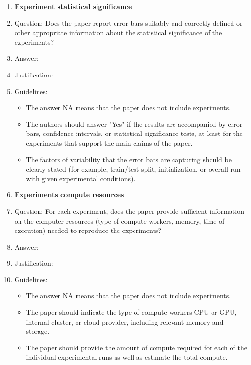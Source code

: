 \documentclass{article}
\begin{document}
\begin{enumerate}
\item {\bf Experiment statistical significance}
    \item[] Question: Does the paper report error bars suitably and correctly defined or other appropriate information about the statistical significance of the experiments?
    \item[] Answer: \answerTODO{} %
    \item[] Justification: \justificationTODO{}
    \item[] Guidelines:
    \begin{itemize}
        \item The answer NA means that the paper does not include experiments.
        \item The authors should answer "Yes" if the results are accompanied by error bars, confidence intervals, or statistical significance tests, at least for the experiments that support the main claims of the paper.
        \item The factors of variability that the error bars are capturing should be clearly stated (for example, train/test split, initialization, or overall run with given experimental conditions).
    \end{itemize}

\item {\bf Experiments compute resources}
    \item[] Question: For each experiment, does the paper provide sufficient information on the computer resources (type of compute workers, memory, time of execution) needed to reproduce the experiments?
    \item[] Answer: \answerTODO{} %
    \item[] Justification: \justificationTODO{}
    \item[] Guidelines:
    \begin{itemize}
        \item The answer NA means that the paper does not include experiments.
        \item The paper should indicate the type of compute workers CPU or GPU, internal cluster, or cloud provider, including relevant memory and storage.
        \item The paper should provide the amount of compute required for each of the individual experimental runs as well as estimate the total compute. 
    \end{itemize}
    

\end{enumerate}
\end{document}

